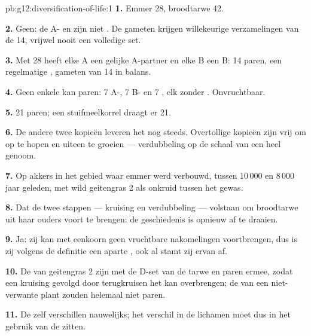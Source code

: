 \begin{solution}{pb:g12:diversification-of-life:1}
\textbf{1.} Emmer 28, broodtarwe 42.

\textbf{2.} Geen: de A- en  zijn niet . De gameten
krijgen willekeurige verzamelingen van de 14, vrijwel nooit een volledige
set.

\textbf{3.} Met 28  heeft elke A een gelijke A-partner en elke
B een B: 14 paren, een regelmatige , gameten van 14 in balans.

\textbf{4.} Geen enkele kan paren: 7 A-, 7 B- en 7 , elk
zonder . Onvruchtbaar.

\textbf{5.} 21 paren; een stuifmeelkorrel draagt er 21.

\textbf{6.} De andere twee kopieën leveren het  nog steeds.
Overtollige kopieën zijn vrij om  op te hopen en uiteen te groeien
--- verdubbeling op de schaal van een heel genoom.

\textbf{7.} Op akkers in het gebied waar emmer werd verbouwd, tussen
10\,000 en 8\,000 jaar geleden, met wild geitengras 2 als onkruid tussen
het gewas.

\textbf{8.} Dat de twee stappen --- kruising en verdubbeling ---
volstaan om broodtarwe uit haar ouders voort te brengen: de geschiedenis
is opnieuw af te draaien.

\textbf{9.} Ja: zij kan met eenkoorn geen vruchtbare nakomelingen
voortbrengen, dus is zij volgens de definitie een aparte , ook al
stamt zij ervan af.

\textbf{10.} De  van geitengras 2 zijn  met de D-set
van de tarwe en paren ermee, zodat een kruising gevolgd door terugkruisen
het  kan overbrengen; de  van een niet-verwante plant zouden
helemaal niet paren.

\textbf{11.} De  zelf verschillen nauwelijks; het verschil in de
lichamen moet dus in het gebruik van de  zitten.


\end{solution}
